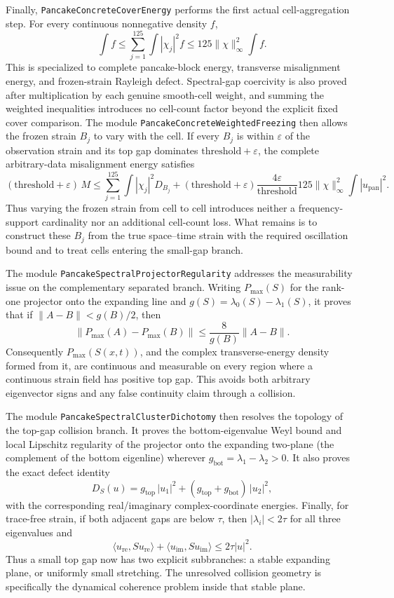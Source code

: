 \documentclass[11pt]{article}
\theoremstyle{definition}
\begin{document}
Finally, \texttt{PancakeConcreteCoverEnergy} performs the first actual
cell-aggregation step.  For every continuous nonnegative density $f$,
\[
 \int f\leq\sum_{j=1}^{125}\int |\chi_j|^2f
 \leq 125\|\chi\|_\infty^2\int f.
\]
This is specialized to complete pancake-block energy, transverse
misalignment energy, and frozen-strain Rayleigh defect.  Spectral-gap
coercivity is also proved after multiplication by each genuine smooth-cell
weight, and summing the weighted inequalities introduces no cell-count factor
beyond the explicit fixed cover comparison.  The module
\texttt{PancakeConcreteWeightedFreezing} then allows the frozen strain $B_j$
to vary with the cell.  If every $B_j$ is within $\varepsilon$ of the
observation strain and its top gap dominates $\mathrm{threshold}+\varepsilon$,
the complete arbitrary-data misalignment energy satisfies
\[
 (\mathrm{threshold}+\varepsilon)\,M
 \leq \sum_{j=1}^{125}\int |\chi_j|^2 D_{B_j}
 + (\mathrm{threshold}+\varepsilon)
   \frac{4\varepsilon}{\mathrm{threshold}}
   125\|\chi\|_\infty^2\int |u_{\mathrm{pan}}|^2 .
\]
Thus varying the frozen strain from cell to cell introduces neither a
frequency-support cardinality nor an additional cell-count loss.  What remains
is to construct these $B_j$ from the true space--time strain with the required
oscillation bound and to treat cells entering the small-gap branch.

The module \texttt{PancakeSpectralProjectorRegularity} addresses the
measurability issue on the complementary separated branch.  Writing
$P_{\max}(S)$ for the rank-one projector onto the expanding line and
$g(S)=\lambda_0(S)-\lambda_1(S)$, it proves that if
$\|A-B\|<g(B)/2$, then
\[
  \|P_{\max}(A)-P_{\max}(B)\|
  \leq \frac{8}{g(B)}\|A-B\|.
\]
Consequently $P_{\max}(S(x,t))$, and the complex transverse-energy density
formed from it, are continuous and measurable on every region where a
continuous strain field has positive top gap.  This avoids both arbitrary
eigenvector signs and any false continuity claim through a collision.

The module \texttt{PancakeSpectralClusterDichotomy} then resolves the topology
of the top-gap collision branch.  It proves the bottom-eigenvalue Weyl bound
and local Lipschitz regularity of the projector onto the expanding two-plane
(the complement of the bottom eigenline) wherever
$g_{\mathrm{bot}}=\lambda_1-\lambda_2>0$.  It also proves the exact defect
identity
\[
 D_S(u)=g_{\mathrm{top}}\,|u_1|^2
       +(g_{\mathrm{top}}+g_{\mathrm{bot}})\,|u_2|^2,
\]
with the corresponding real/imaginary complex-coordinate energies.  Finally,
for trace-free strain, if both adjacent gaps are below $\tau$, then
$|\lambda_i|<2\tau$ for all three eigenvalues and
\[
 \langle u_{\mathrm{re}},S u_{\mathrm{re}}\rangle
 +\langle u_{\mathrm{im}},S u_{\mathrm{im}}\rangle
 \leq 2\tau |u|^2.
\]
Thus a small top gap now has two explicit subbranches: a stable expanding
plane, or uniformly small stretching.  The unresolved collision geometry is
specifically the dynamical coherence problem inside that stable plane.
\end{document}
